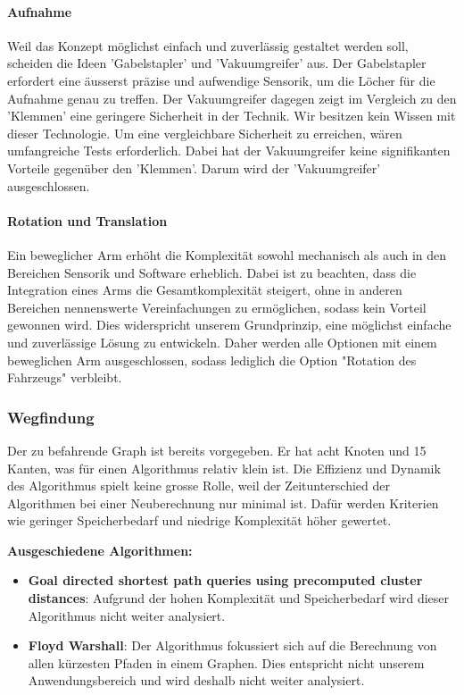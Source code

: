 \documentclass[../main.tex]{subfiles}
\begin{document}
        \paragraph{Aufnahme}
        Weil das Konzept möglichst einfach und zuverlässig gestaltet werden soll, scheiden die Ideen 'Gabelstapler' und 'Vakuumgreifer' aus. Der Gabelstapler erfordert eine äusserst präzise und aufwendige Sensorik, um die Löcher für die Aufnahme genau zu treffen. Der Vakuumgreifer dagegen zeigt im Vergleich zu den 'Klemmen' eine geringere Sicherheit in der Technik. Wir besitzen kein Wissen mit dieser Technologie. Um eine vergleichbare Sicherheit zu erreichen, wären umfangreiche Tests erforderlich. Dabei hat der Vakuumgreifer keine signifikanten Vorteile gegenüber den 'Klemmen'. Darum wird der 'Vakuumgreifer' ausgeschlossen.
        
        \paragraph{Rotation und Translation}
        Ein beweglicher Arm erhöht die Komplexität sowohl mechanisch als auch in den Bereichen Sensorik und Software erheblich. Dabei ist zu beachten, dass die Integration eines Arms die Gesamtkomplexität steigert, ohne in anderen Bereichen nennenswerte Vereinfachungen zu ermöglichen, sodass kein Vorteil gewonnen wird. Dies widerspricht unserem Grundprinzip, eine möglichst einfache und zuverlässige Lösung zu entwickeln. Daher werden alle Optionen mit einem beweglichen Arm ausgeschlossen, sodass lediglich die Option "Rotation des Fahrzeugs" verbleibt.


\newpage
\subsubsection{Wegfindung}

Der zu befahrende Graph ist bereits vorgegeben. Er hat acht Knoten und 15 Kanten, was 
für einen Algorithmus relativ klein ist. Die Effizienz und Dynamik des Algorithmus spielt keine grosse Rolle, weil der Zeitunterschied der Algorithmen bei einer Neuberechnung nur minimal ist. Dafür werden Kriterien wie geringer Speicherbedarf und niedrige Komplexität höher gewertet.

\textbf{Ausgeschiedene Algorithmen:}

\begin{itemize}
    \item \textbf{Goal directed shortest path queries using precomputed cluster distances}: Aufgrund der hohen Komplexität und Speicherbedarf wird dieser Algorithmus nicht weiter analysiert.
    \item \textbf{Floyd Warshall}: Der Algorithmus fokussiert sich auf die Berechnung von allen kürzesten Pfaden in einem Graphen. Dies entspricht nicht unserem Anwendungsbereich und wird deshalb nicht weiter analysiert.
\end{itemize}
\end{document}

